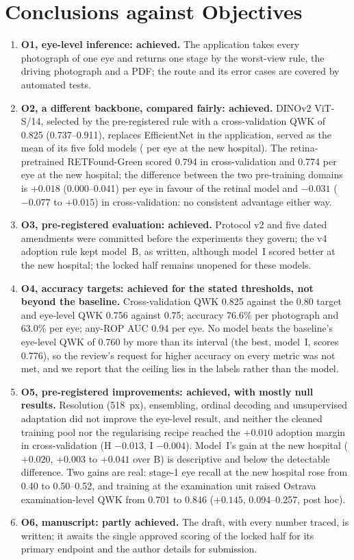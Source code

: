 \section{Conclusions against Objectives}
\begin{enumerate}
\item \textbf{O1, eye-level inference: achieved.} The application takes every photograph of one eye and returns one stage by the worst-view rule, the driving photograph and a PDF; the route and its error cases are covered by automated tests.
\item \textbf{O2, a different backbone, compared fairly: achieved.} DINOv2 ViT-S/14, selected by the pre-registered rule with a cross-validation QWK of 0.825 (0.737--0.911), replaces EfficientNet in the application, served as the mean of its five fold models (\DeployedQWK{} per eye at the new hospital). The retina-pretrained RETFound-Green scored 0.794 in cross-validation and 0.774 per eye at the new hospital; the difference between the two pre-training domains is $+0.018$ (0.000--0.041) per eye in favour of the retinal model and $-0.031$ ($-0.077$ to $+0.015$) in cross-validation: no consistent advantage either way.
\item \textbf{O3, pre-registered evaluation: achieved.} Protocol v2 and five dated amendments were committed before the experiments they govern; the v4 adoption rule kept model~B, as written, although model~I scored better at the new hospital; the locked half remains unopened for these models.
\item \textbf{O4, accuracy targets: achieved for the stated thresholds, not beyond the baseline.} Cross-validation QWK 0.825 against the 0.80 target and eye-level QWK 0.756 against 0.75; accuracy 76.6\% per photograph and 63.0\% per eye; any-ROP AUC 0.94 per eye. No model beats the baseline's eye-level QWK of 0.760 by more than its interval (the best, model~I, scores 0.776), so the review's request for higher accuracy on every metric was not met, and we report that the ceiling lies in the labels rather than the model.
\item \textbf{O5, pre-registered improvements: achieved, with mostly null results.} Resolution (518~px), ensembling, ordinal decoding and unsupervised adaptation did not improve the eye-level result, and neither the cleaned training pool nor the regularising recipe reached the $+0.010$ adoption margin in cross-validation (H $-0.013$, I $-0.004$). Model~I's gain at the new hospital ($+0.020$, $+0.003$ to $+0.041$ over B) is descriptive and below the detectable difference. Two gains are real: stage-1 eye recall at the new hospital rose from 0.40 to 0.50--0.52, and training at the examination unit raised Ostrava examination-level QWK from 0.701 to 0.846 ($+0.145$, 0.094--0.257, post hoc).
\item \textbf{O6, manuscript: partly achieved.} The draft, with every number traced, is written; it awaits the single approved scoring of the locked half for its primary endpoint and the author details for submission.
\end{enumerate}

